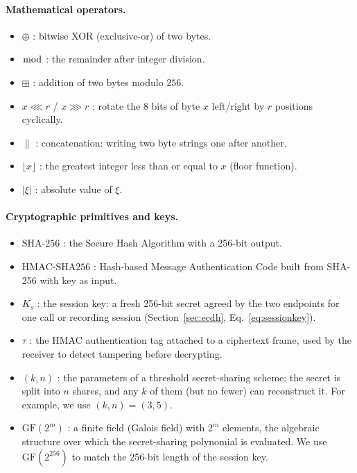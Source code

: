 \documentclass[pdflatex,sn-mathphys-num]{sn-jnl}%
\theoremstyle{thmstyleone}%
\theoremstyle{thmstyletwo}%
\theoremstyle{thmstylethree}%
\begin{document}
\paragraph{Mathematical operators.}
\begin{itemize}[leftmargin=2em]
\item $\oplus$ : bitwise XOR (exclusive-or) of two bytes.
\item $\bmod$ : the remainder after integer division.
\item $\boxplus$ : addition of two bytes modulo $256$.
\item $x \lll r$ / $x \ggg r$ : rotate the 8 bits of byte $x$ left/right by $r$ positions cyclically.
\item $\|$ : concatenation: writing two byte strings one after another.
\item $\lfloor x \rfloor$ : the greatest integer less than or equal to $x$ (floor function).
\item $|\xi|$ : absolute value of $\xi$.
\end{itemize}

\paragraph{Cryptographic primitives and keys.}
\begin{itemize}[leftmargin=2em]
\item $\mathrm{SHA\text{-}256}$ : the Secure Hash Algorithm with a 256-bit output.
\item $\mathrm{HMAC\text{-}SHA256}$ : Hash-based Message Authentication Code built from SHA-256 with key as input.
\item $K_s$ : the session key: a fresh 256-bit secret agreed by the two endpoints for one call or recording session (Section~\ref{sec:ecdh}, Eq.~\eqref{eq:sessionkey}).
\item $\tau$ : the HMAC authentication tag attached to a ciphertext frame, used by the receiver to detect tampering before decrypting.
\item $(k,n)$ : the parameters of a threshold secret-sharing scheme: the secret is split into $n$ shares, and any $k$ of them (but no fewer) can reconstruct it. For example, we use $(k,n)=(3,5)$.
\item $\mathrm{GF}(2^m)$ : a finite field (Galois field) with $2^m$ elements, the algebraic structure over which the secret-sharing polynomial is evaluated. We use $\mathrm{GF}(2^{256})$ to match the 256-bit length of the session key.
\end{itemize}
\end{document}
